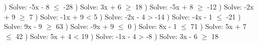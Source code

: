 \documentclass{article}%
\begin{document}
\newline%
) Solve: -5x - 8 $\leq$ -28%
\newline%
\newline%
) Solve: 3x + 6 $\geq$ 18%
\newline%
\newline%
) Solve: -5x + 8 $\geq$ -12%
\newline%
\newline%
) Solve: -2x + 9 $\geq$ 7%
\newline%
\newline%
) Solve: -1x + 9 < 5%
\newline%
\newline%
) Solve: -2x - 4 > -14%
\newline%
\newline%
) Solve: -4x - 1 $\leq$ -21%
\newline%
\newline%
) Solve: 9x - 9 $\geq$ 63%
\newline%
\newline%
) Solve: -9x + 9 $\leq$ 0%
\newline%
\newline%
) Solve: 8x - 1 $\leq$ 71%
\newline%
\newline%
) Solve: 5x + 7 $\leq$ 42%
\newline%
\newline%
) Solve: 5x + 4 < 19%
\newline%
\newline%
) Solve: -1x - 4 > -8%
\newline%
\newline%
) Solve: 3x - 6 $\geq$ 18%
\newline%
\newline%
\newline%
\pagebreak%
\end{document}

